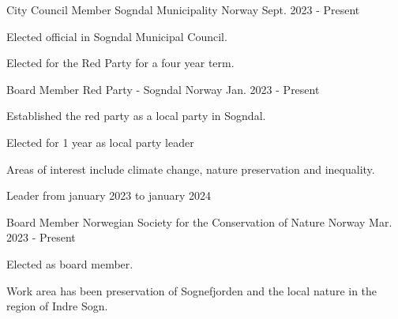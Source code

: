 

\begin{cventries}

  \cventry
  {City Council Member} %
  {Sogndal Municipality} %
  {Norway} %
  {Sept. 2023 - Present} %
  {
    \begin{cvitems} %
      \item {Elected official in Sogndal Municipal Council.}
      \item {Elected for the Red Party for a four year term.}
    \end{cvitems}
  }

  \cventry
    {Board Member} %
    {Red Party - Sogndal} %
    {Norway} %
    {Jan. 2023 - Present} %
    {
      \begin{cvitems} %
        \item {Established the red party as a local party in Sogndal.}
        \item {Elected for 1 year as local party leader}
        \item {Areas of interest include climate change, nature preservation and inequality.}
        \item {Leader from january 2023 to january 2024}
      \end{cvitems}
    }

  \cventry
    {Board Member} %
    {Norwegian Society for the Conservation of Nature} %
    {Norway} %
    {Mar. 2023 - Present} %
    {
      \begin{cvitems} %
        \item {Elected as board member.}
        \item {Work area has been preservation of Sognefjorden and the local nature in the region of Indre Sogn.}
      \end{cvitems}
    }

\end{cventries}
